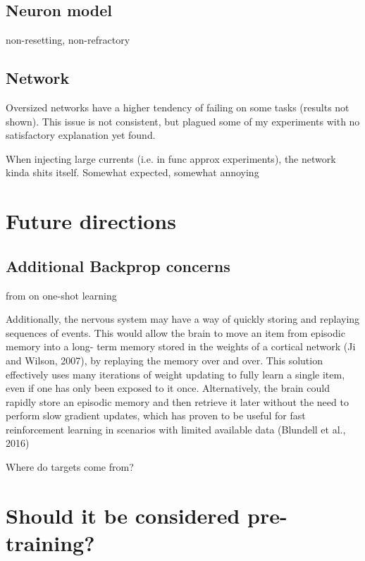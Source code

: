 \subsection*{Neuron model}

non-resetting, non-refractory

\subsection*{Network}

Oversized networks have a higher tendency of failing on some tasks (results not shown). This issue is not consistent,
but plagued some of my experiments with no satisfactory explanation yet found.


 When injecting large currents (i.e. in func approx experiments), the network kinda shits itself. Somewhat
expected, somewhat annoying




\section{Future directions}

\subsection{Additional Backprop concerns}


from \citep{Marblestone2016} on one-shot learning

Additionally, the nervous system may have a way of quickly
storing and replaying sequences of events. This would allow
the brain to move an item from episodic memory into a long-
term memory stored in the weights of a cortical network (Ji and
Wilson, 2007), by replaying the memory over and over. This
solution effectively uses many iterations of weight updating to
fully learn a single item, even if one has only been exposed to
it once. Alternatively, the brain could rapidly store an episodic
memory and then retrieve it later without the need to perform
slow gradient updates, which has proven to be useful for
fast reinforcement learning in scenarios with limited available
data (Blundell et al., 2016)


Where do targets come from? \cite{Bengio2015}

\section{Should it be considered pre-training?}


